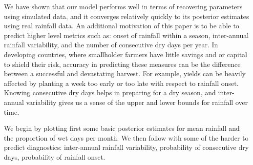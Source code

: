 \documentclass[11pt]{article}
\begin{document}
We have shown that our model performs well in terms of recovering parameters using simulated data, and it converges relatively quickly to its posterior estimates using real rainfall data. An additional motivation of this paper is to be able to predict higher level metrics such as: onset of rainfall within a season, inter-annual rainfall variability, and the number of consecutive dry days per year. In developing countries, where smallholder farmers have little savings and or capital to shield their risk, accuracy in predicting these measures can be the difference between a successful and devastating harvest. For example, yields can be heavily affected by planting a week too early or too late with respect to rainfall onset. Knowing consecutive dry days helps in preparing for a dry season, and inter-annual variability gives us a sense of the upper and lower bounds for rainfall over time. 

We begin by plotting first some basic posterior estimates for mean rainfall and the proportion of wet days per month. We then follow with some of the harder to predict diagnostics: inter-annual rainfall variability, probability of consecutive dry days, probability of rainfall onset.








\end{document}
